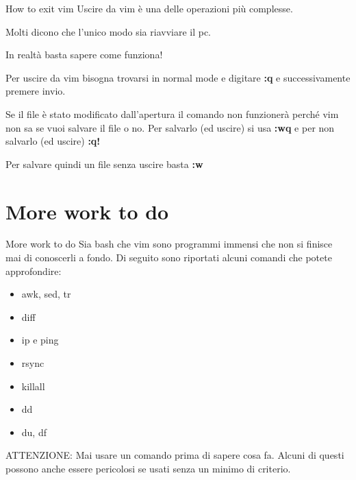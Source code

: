 \documentclass{beamer}
\begin{document}
\begin{frame}{How to exit vim}
  Uscire da vim è una delle operazioni più complesse. \medskip \pause

  Molti dicono che l'unico modo sia riavviare il pc. \medskip \pause

  In realtà basta sapere come funziona! \medskip

  Per uscire da vim bisogna trovarsi in normal mode e digitare \textbf{:q} e 
  successivamente premere invio.\medskip

  Se il file è stato modificato dall'apertura il comando non funzionerà perché
  vim non sa se vuoi salvare il file o no. Per salvarlo (ed uscire) si usa 
  \textbf{:wq} e per non salvarlo (ed uscire) \textbf{:q!} \medskip

  Per salvare quindi un file senza uscire basta \textbf{:w}
\end{frame}

\section{More work to do}
\begin{frame}{More work to do}
  Sia bash che vim sono programmi immensi che non si finisce mai di conoscerli a
  fondo. Di seguito sono riportati alcuni comandi che potete approfondire: 
  \medskip
  \begin{itemize}
    \item awk, sed, tr
    \item diff
    \item ip e ping
    \item rsync
    \item killall
    \item dd
    \item du, df
  \end{itemize}
  ATTENZIONE: Mai usare un comando prima di sapere cosa fa. Alcuni di questi
  possono anche essere pericolosi se usati senza un minimo di criterio.
\end{frame}
\end{document}
